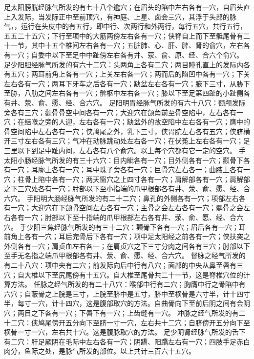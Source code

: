 \documentclass[a4paper,12pt,UTF8,twoside]{ctexbook}
\begin{document}
足太阳膀胱经脉气所发的有七十八个逾穴；在眉头的陷中左右各有一穴，自眉头直上入发际，当发际正中至前顶穴，有神庭、上星、卤会三穴，其浮于头部的脉气，，运行在头皮中的有五行，即中行、次两行和外两行，每行五穴，共行五行，五五二十五穴；下行至项中的大筋两傍左右各有一穴；侠脊自上而下至骶尾骨有二十一节，其中十五个椎间左右各有一穴；五脏肺、心、肝、脾、肾的俞穴，左右各有一穴；自委中以下至足中中趾傍左右各有井、荥、俞、原、经、合六个俞穴。
足少阳胆经脉气所发的有六十二穴：头两角上各有二穴；两目瞳孔直上的发际内各有五穴；两耳前角上各有一穴；上关左右各一穴；两而后的陷凹中各有一穴；下关左右各有一穴；两耳下牙车之后各有一穴；缺盆左右各有一穴；腋下三寸，从胁下至胁，八肋之间左右各有一穴；髀枢中左右各一穴；膝以下至足第四趾的小趾侧各有井、荥、俞、愿、经、合六穴。
足阳明胃经脉气所发的有六十八穴：额颅发际旁各有三穴；颧骨骨空中间各有一穴；大迎穴在颌角前至骨空陷中，左右各有一穴；在结喉之旁的人迎，左右各有一穴；缺盆外的故空陷中左右各有一穴；膺中的骨空间陷中左右各有一穴；侠鸠尾之外，乳下三寸，侠胃脘左右各有五穴；侠脐横开三寸左右各有三穴；气冲在动脉跳动处左右各一穴；在伏菟上左右各有一穴；足三里以下到足中趾内间，左右各有八个俞穴。以上每个穴都有它一定的空穴。
手太阳小肠经脉气所发的有三十六穴：目内眦各有一穴；目外侧各有一穴；颧骨下各有一穴；耳廓上各有一穴；耳中珠子旁各有一穴；巨骨穴左右各一；曲腋上各有一穴；柱骨上陷中各有一穴；两天窗穴之上四寸各有一穴；肩解部各有一穴；肩解部之下三穴处各有一穴；肘部以下至小指端的爪甲根部各有井、荥、俞、愿、经、合六穴。
手阳明大肠经脉气所发的有二十二穴；鼻孔的外侧各有一穴；项部左右各有一穴；大迎穴在下颌骨空间左右各有一穴；主骨之会左右各有一穴；髃骨之会左右各有一穴；肘部以下至十指端的爪甲根部左右各有井、荥、俞、愿、经、合六穴。
手少阳三焦经脉气所发的有三十二穴：颧骨下各有一穴；眉后各有一穴；耳前角上各有一穴；耳后完骨后下各有一穴；项中足太阳经之前各有一穴；侠扶突之外侧各有一穴；肩贞血左右各一；在肩贞穴之下三寸分肉之间各有三穴；肘部以下至手无名指之端爪甲根部各有井、荥、俞、愿、经、合六穴。
督脉之经气所发的有二十八穴：项中央有二穴；前发际向后中行有八穴；面部的中央从鼻至唇有三穴；自大椎以下至尻尾傍有十五穴。自大椎至尾骨共二十一节，这是脊椎穴位的计算方法。
任脉之经气所发的有二十八穴：喉部中行有二穴；胸膺中行之骨陷中有六穴；自蔽骨之上脘是三寸，上脘至脐中是五寸，脐中至横骨是六寸半，计十四寸半，每寸一穴，计十四穴，这是腹部取穴的方法。自曲骨向下至前后阴之间有会阴穴；两目之下各有一穴；下唇下有一穴；上齿缝有一穴。
冲脉之经气所发的有二十二穴：侠鸠尾傍开五分向下至脐一寸一穴，左右共十二穴；自脐傍开五分向下至横骨一寸一穴，左右共十穴。这是腹脉取穴的方法。
足少阴肾经脉气所发的舌下有二穴：肝足厥阴在毛际中左右各有一穴；阴蹻、阳蹻左右有一穴；四肢手足赤白肉分，鱼际之处，是脉气所发的部位。以上共计三百六十五穴。
\end{document}
